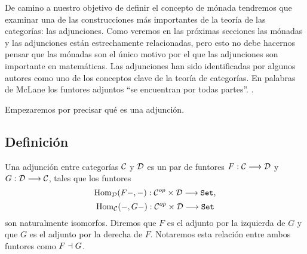 De camino a nuestro objetivo de definir el concepto de mónada
tendremos que examinar una de las construcciones más importantes
de la teoría de las categorías: las adjunciones.
Como veremos en las próximas
secciones las mónadas y las adjunciones están estrechamente relacionadas,
pero esto no debe hacernos pensar que las mónadas son el único motivo
por el que las adjunciones son importante en matemáticas. Las adjunciones
han sido identificadas por algunos autores como uno de los conceptos
clave de la teoría de categorías. En palabras
de McLane los funtores adjuntos ``se encuentran por todas partes''.
\cite{ariseeverywhere}.

Empezaremos por precisar qué es una adjunción.
\subsection{Definición}
\begin{definition}
  Una adjunción entre categorías $\mathcal{C}$ y $\mathcal{D}$ es un par de funtores
  $F : \mathcal{C}\longrightarrow \mathcal{D}$ y $G: \mathcal{D}\longrightarrow \mathcal{C}$, tales que los funtores
  $$\operatorname{Hom}_{\mathcal{D}}(F-, -) : \mathcal{C}^{op}\times\mathcal{D}\longrightarrow \texttt{Set},$$
  $$\operatorname{Hom}_{\mathcal{C}}(-, G-) : \mathcal{C}^{op}\times\mathcal{D}\longrightarrow \texttt{Set}$$
  son naturalmente isomorfos.
  Diremos que $F$ es el
  adjunto por la izquierda de $G$ y que $G$ es el adjunto
  por la derecha de $F$. Notaremos esta relación entre ambos funtores
  como $F \dashv G$.
\end{definition}

